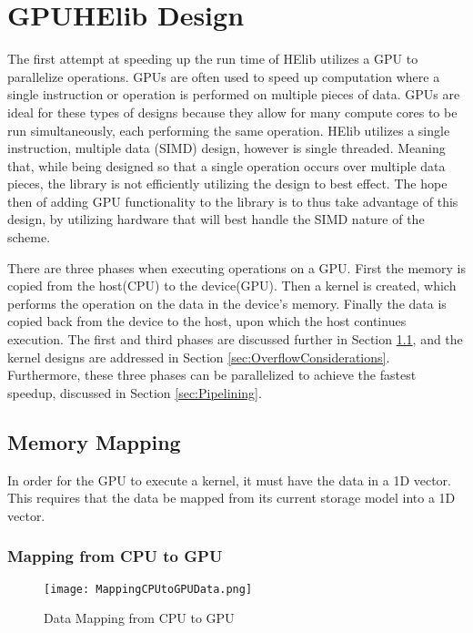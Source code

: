 \chapter{GPUHElib Design} \label{chap:GPUHElibDesign}
The first attempt at speeding up the run time of HElib utilizes a GPU to parallelize operations. GPUs are often used to speed up computation where a single instruction or operation is performed on multiple pieces of data. GPUs are ideal for these types of designs because they allow for many compute cores to be run simultaneously, each performing the same operation. HElib utilizes a single instruction, multiple data (SIMD) design, however is single threaded. Meaning that, while being designed so that a single operation occurs over multiple data pieces, the library is not efficiently utilizing the design to best effect. The hope then of adding GPU functionality to the library is to thus take advantage of this design, by utilizing hardware that will best handle the SIMD nature of the scheme. 

There are three phases when executing operations on a GPU. First the memory is copied from the host(CPU) to the device(GPU). Then a kernel is created, which performs the operation on the data in the device's memory. Finally the data is copied back from the device to the host, upon which the host continues execution. The first and third phases are discussed further in Section \ref{sec:MemoryMapping}, and the kernel designs are addressed in Section \ref{sec:OverflowConsiderations}. Furthermore, these three phases can be parallelized to achieve the fastest speedup, discussed in Section \ref{sec:Pipelining}.

\section{Memory Mapping} \label{sec:MemoryMapping}
In order for the GPU to execute a kernel, it must have the data in a 1D vector. This requires that the data be mapped from its current storage model into a 1D vector.

\subsection{Mapping from CPU to GPU}

\begin{figure}[t!]
\centering
\texttt{[image: MappingCPUtoGPUData.png]}
\caption{Data Mapping from CPU to GPU}
\label{fig:MappingCPUtoGPUData}
\end{figure}

